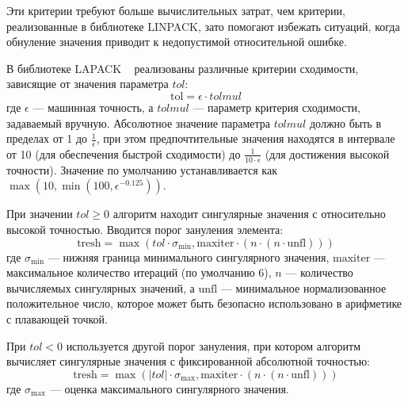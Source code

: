 Эти критерии требуют больше вычислительных затрат, чем критерии, реализованные в библиотеке LINPACK, зато помогают избежать ситуаций, когда обнуление значения приводит к недопустимой относительной ошибке.

В библиотеке LAPACK ~\cite{Anderson1999} реализованы различные критерии сходимости, зависящие от значения параметра \(tol\):
\begin{equation}
\text{tol} = \epsilon \cdot tolmul
\end{equation}
где \(\epsilon\) — машинная точность, а \(tolmul\) — параметр критерия сходимости, задаваемый вручную. Абсолютное значение параметра \(tolmul\) должно быть в пределах от 1 до \(\frac{1}{\epsilon}\), при этом предпочтительные значения находятся в интервале от 10 (для обеспечения быстрой сходимости) до \(\frac{1}{10 \cdot \epsilon}\) (для достижения высокой точности). Значение по умолчанию устанавливается как \(\max(10, \min(100, \epsilon^{-0.125}))\).

При значении \(tol \geq 0\) алгоритм находит сингулярные значения с относительно высокой точностью. Вводится порог зануления элемента:
\begin{equation}
\text{tresh} = \max(tol \cdot \sigma_{\text{min}}, \text{maxiter} \cdot (n \cdot (n \cdot \text{unfl})))
\end{equation}
где \(\sigma_{\text{min}}\) — нижняя граница минимального сингулярного значения, \(\text{maxiter}\) — максимальное количество итераций (по умолчанию 6), \(n\) — количество вычисляемых сингулярных значений, а \(\text{unfl}\) — минимальное нормализованное положительное число, которое может быть безопасно использовано в арифметике с плавающей точкой.

При \(tol < 0\) используется другой порог зануления, при котором алгоритм вычисляет сингулярные значения с фиксированной абсолютной точностью:
\begin{equation}
\text{tresh} = \max (|tol| \cdot \sigma_{\text{max}}, \text{maxiter} \cdot (n \cdot (n \cdot \text{unfl})))
\end{equation}
где \(\sigma_{\text{max}}\) — оценка максимального сингулярного значения.

